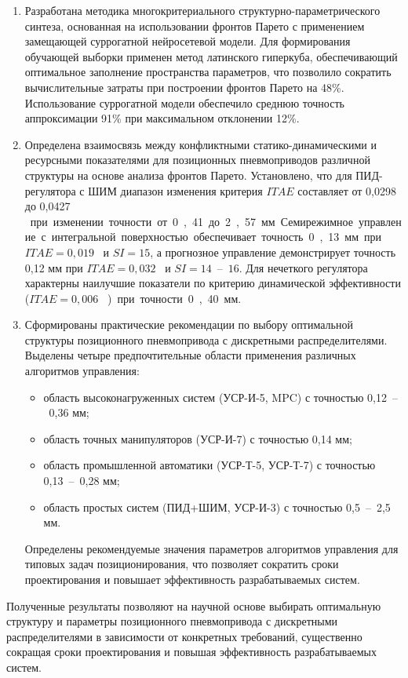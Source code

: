 \begin{enumerate}
    \item Разработана методика многокритериального структурно-параметрического синтеза, основанная
    на использовании фронтов Парето с применением замещающей суррогатной нейросетевой модели. Для
    формирования обучающей выборки применен метод латинского гиперкуба, обеспечивающий оптимальное
    заполнение пространства параметров, что позволило сократить вычислительные затраты при построении
    фронтов Парето на 48\%. Использование суррогатной модели обеспечило среднюю точность аппроксимации 91\%
    при максимальном отклонении 12\%.

    \item Определена взаимосвязь между конфликтными статико-динамическими и ресурсными показателями
    для позиционных пневмоприводов различной структуры на основе анализа фронтов Парето. Установлено,
    что для ПИД-регулятора с ШИМ диапазон изменения критерия $ITAE$ составляет от 0,0298 до 0,0427 \si{\meter\per\second\square}
    при изменении точности от 0,41 до 2,57 мм. Семирежимное управление с интегральной поверхностью
    обеспечивает точность 0,13 мм при $ITAE = 0,019$ \si{\meter\per\second\square} и $SI = 15$, а прогнозное управление демонстрирует
    точность 0,12 мм при $ITAE = 0,032$ \si{\meter\per\second\square} и $SI = 14$~--~$16$. Для нечеткого регулятора характерны
    наилучшие показатели по критерию динамической эффективности ($ITAE = 0,006$ \si{\meter\per\second\square}) при точности 0,40 мм.

    \item Сформированы практические рекомендации по выбору оптимальной структуры позиционного
    пневмопривода с дискретными распределителями. Выделены четыре предпочтительные области
    применения различных алгоритмов управления:
    \begin{itemize}
        \item область высоконагруженных систем (УСР-И-5, MPC) с точностью 0,12~--~0,36 мм;
        \item область точных манипуляторов (УСР-И-7) с точностью 0,14 мм;
        \item область промышленной автоматики (УСР-Т-5, УСР-Т-7) с точностью 0,13~--~0,28 мм;
        \item область простых систем (ПИД+ШИМ, УСР-И-3) с точностью 0,5~--~2,5 мм.
    \end{itemize}
    Определены рекомендуемые значения параметров алгоритмов управления для типовых задач
    позиционирования, что позволяет сократить сроки проектирования и повышает эффективность разрабатываемых систем.
\end{enumerate}

Полученные результаты позволяют на научной основе выбирать оптимальную структуру и
параметры позиционного пневмопривода с дискретными распределителями в зависимости
от конкретных требований, существенно сокращая сроки проектирования и повышая
эффективность разрабатываемых систем.